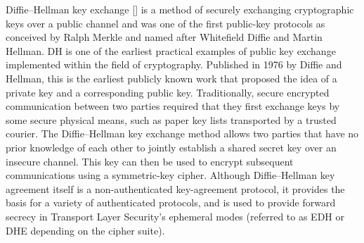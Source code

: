 Diffie–Hellman key exchange [\cite{li2010research}] is a method of securely exchanging cryptographic keys over a public channel
and was one of the first public-key protocols
as conceived by Ralph Merkle and named after Whitefield Diffie and Martin Hellman.
DH is one of the earliest practical examples of public key exchange implemented within the field of cryptography.
Published in 1976 by Diffie and Hellman, this is the earliest publicly known work that proposed the idea of a private
key and a corresponding public key.
Traditionally, secure encrypted communication between two parties required that they first exchange keys by some secure physical means,
such as paper key lists transported by a trusted courier.
The Diffie–Hellman key exchange method allows two parties that have no prior knowledge of
each other to jointly establish a shared secret key over an insecure channel.
This key can then be used to encrypt subsequent communications using a symmetric-key cipher.
Although Diffie–Hellman key agreement itself is a non-authenticated key-agreement protocol, it provides the basis for a
variety of authenticated protocols, and is used to provide forward secrecy in Transport Layer Security's ephemeral modes
(referred to as EDH or DHE depending on the cipher suite).


